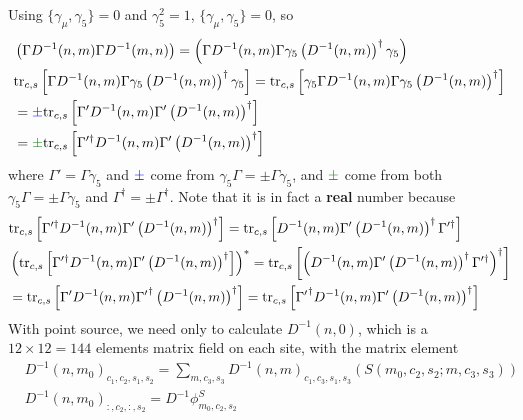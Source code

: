 Using $\{\gamma _{\mu},\gamma _5\}=0$ and $\gamma _5^2=1$, $\{\gamma _{\mu},\gamma _5\}=0$, so
\begin{equation}
\begin{split}
&\left(\Gamma D^{-1}(n,m)\Gamma D^{-1}(m,n)\right)=\left(\Gamma D^{-1}(n,m) \Gamma \gamma _5 \left(D^{-1}(n,m)\right)^{\dagger}\gamma _5\right)\\
&{\rm tr}_{c,s}\left[\Gamma D^{-1}(n,m) \Gamma \gamma _5 \left(D^{-1}(n,m)\right)^{\dagger}\gamma _5\right]={\rm tr}_{c,s}\left[\gamma _5\Gamma D^{-1}(n,m) \Gamma \gamma _5 \left(D^{-1}(n,m)\right)^{\dagger}\right]\\
&=\textcolor[rgb]{0,0,1}{\pm} {\rm tr}_{c,s}\left[\Gamma' D^{-1}(n,m) \Gamma' \left(D^{-1}(n,m)\right)^{\dagger}\right]\\
&=\textcolor[rgb]{0,0.5,0}{\pm} {\rm tr}_{c,s}\left[\Gamma'^{\dagger} D^{-1}(n,m) \Gamma' \left(D^{-1}(n,m)\right)^{\dagger}\right]\\
\end{split}
\end{equation}
where $\Gamma ' = \Gamma \gamma _5$ and $\textcolor[rgb]{0,0,1}{\pm}$ come from $\gamma _5\Gamma=\pm \Gamma \gamma _5$, and $\textcolor[rgb]{0,0.5,0}{\pm}$ come from both $\gamma _5\Gamma=\pm \Gamma \gamma _5$ and $\Gamma ^{\dagger}=\pm \Gamma ^{\dagger}$. Note that it is in fact a \textbf{real} number because
\begin{equation}
\begin{split}
&{\rm tr}_{c,s}\left[\Gamma'^{\dagger} D^{-1}(n,m) \Gamma' \left(D^{-1}(n,m)\right)^{\dagger}\right]={\rm tr}_{c,s}\left[D^{-1}(n,m) \Gamma' \left(D^{-1}(n,m)\right)^{\dagger}\Gamma'^{\dagger} \right]\\
&\left({\rm tr}_{c,s}\left[\Gamma'^{\dagger} D^{-1}(n,m) \Gamma' \left(D^{-1}(n,m)\right)^{\dagger}\right]\right)^*={\rm tr}_{c,s}\left[\left(D^{-1}(n,m) \Gamma' \left(D^{-1}(n,m)\right)^{\dagger}\Gamma'^{\dagger} \right)^{\dagger}\right]\\
&={\rm tr}_{c,s}\left[\Gamma' D^{-1}(n,m) {\Gamma'}^{\dagger} \left(D^{-1}(n,m)\right)^{\dagger}\right]={\rm tr}_{c,s}\left[{\Gamma'}^{\dagger} D^{-1}(n,m) \Gamma' \left(D^{-1}(n,m)\right)^{\dagger}\right]
\end{split}
\end{equation}
With point source, we need only to calculate $D^{-1}(n,0)$, which is a $12\times 12=144$ elements matrix field on each site, with the matrix element
\begin{equation}
\begin{split}
&D^{-1}(n,m_0)_{c_1,c_2,s_1,s_2}=\sum _{m,c_3,s_3}D^{-1}(n,m)_{c_1,c_3,s_1,s_3}\left(S(m_0,c_2,s_2;m,c_3,s_3)\right)\\
&D^{-1}(n,m_0)_{:,c_2,:,s_2}=D^{-1} \phi ^{S}_{m_0,c_2,s_2}\\
\end{split}
\end{equation}

